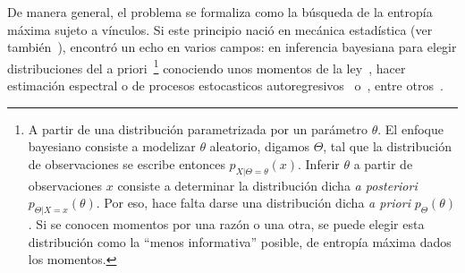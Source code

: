 De manera general, el problema se  formaliza como la b\'usqueda de la entrop\'ia
m\'axima  sujeto  a  v\'inculos.    Si  este  principio  naci\'o  en  mec\'anica
estad\'istica  (ver  tambi\'en~\cite{Jay57,   Jay57:2,  Jay65,  Mer10,  Mer18}),
encontr\'o  un  echo en  varios  campos:  en  inferencia bayesiana  para  elegir
distribuciones   del   a  priori~\footnote{A   partir   de  una   distribuci\'on
  parametrizada por  un par\'ametro $\theta$.   El enfoque bayesiano  consiste a
  modelizar $\theta$  aleatorio, digamos $\Theta$, tal que  la distribuci\'on de
  observaciones se escribe  entonces $p_{X|\Theta=\theta}(x)$.  Inferir $\theta$
  a partir  de observaciones $x$  consiste a determinar la  distribuci\'on dicha
  {\it a  posteriori} $p_{\Theta|X=x}(\theta)$.  Por  eso, hace falta  darse una
  distribuci\'on  dicha  {\it  a  priori}  $p_\Theta(\theta)$.   Si  se  conocen
  momentos por una raz\'on o una  otra, se puede elegir esta distribuci\'on como
  la  ``menos  informativa''  posible,  \ie  de entrop\'ia  m\'axima  dados  los
  momentos.\label{Foot:SZ:Prior}}    conociendo     unos    momentos    de    la
ley~\cite{Rob07,  Jay68,  Jay82,  Csi91},  hacer  estimaci\'on  espectral  o  de
procesos     estocasticos      autoregresivos~\cite{Bur67,     Bur75,     Jay82}
o~\cite[cap.~12]{CovTho06}, entre otros~\cite[\& ref.]{Arn01, Kap89, KapKes92}.

